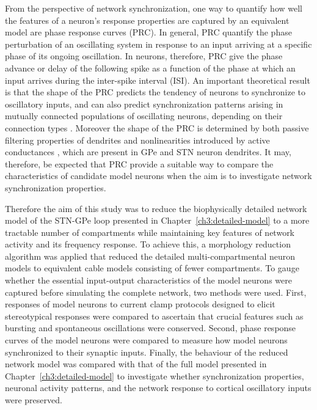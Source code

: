 %
From the perspective of network synchronization,
one way to quantify how well the features of a neuron's response properties
are captured by an equivalent model are phase response curves (PRC).
%
%
%
%
%
%
In general, PRC quantify the phase perturbation of an oscillating system
in response to an input arriving at a specific phase of its ongoing oscillation.
In neurons, therefore, PRC give the phase advance or delay of the following spike
as a function of the phase at which an input arrives during the inter-spike interval (ISI).
An important theoretical result is that the shape of the PRC predicts the
tendency of neurons to synchronize to oscillatory inputs, and can also predict
synchronization patterns arising in mutually connected populations of
oscillating neurons, depending on their connection types \cite{hansel_synchrony_1995,ermentrout_type_1996,goldberg_response_2007,achuthan_phase-resetting_2009,bogaard_interaction_2009,abouzeid_type-ii_2009}.
%
%
%
%
%
%
%
%
Moreover the shape of the PRC is determined by both passive filtering
properties of dendrites and nonlinearities introduced by active conductances
\cite{goldberg_response_2007,gutkin_phase-response_2005,crook_dendritic_1998},
which are present in GPe and STN neuron dendrites. It may, therefore, be expected
that PRC provide a suitable way to compare the characteristics of candidate
model neurons when the aim is to investigate network synchronization properties.
%
%
%
%
%
%
%


%
Therefore the aim of this study was to reduce the biophysically detailed network
model of the STN-GPe loop presented in Chapter~\ref{ch3:detailed-model} to
a more tractable number of compartments while maintaining key features
of network activity and its frequency response. To achieve this, a morphology
reduction algorithm was applied that reduced the detailed multi-compartmental
neuron models to equivalent cable models consisting of fewer compartments.
To gauge whether the essential input-output characteristics of the model neurons
were captured before simulating the complete network, two methods were used.
First, responses of model neurons to current clamp protocols designed to elicit
stereotypical responses were compared to ascertain that crucial features such as bursting
and spontaneous oscillations were conserved.
%
%
Second, phase response curves of the model neurons were compared
to measure how model neurons synchronized to their synaptic inputs.
%
%
Finally, the behaviour of the reduced network model was compared with that
of the full model presented in Chapter~\ref{ch3:detailed-model} to investigate
whether synchronization properties, neuronal activity patterns, and the network
response to cortical oscillatory inputs were preserved.

